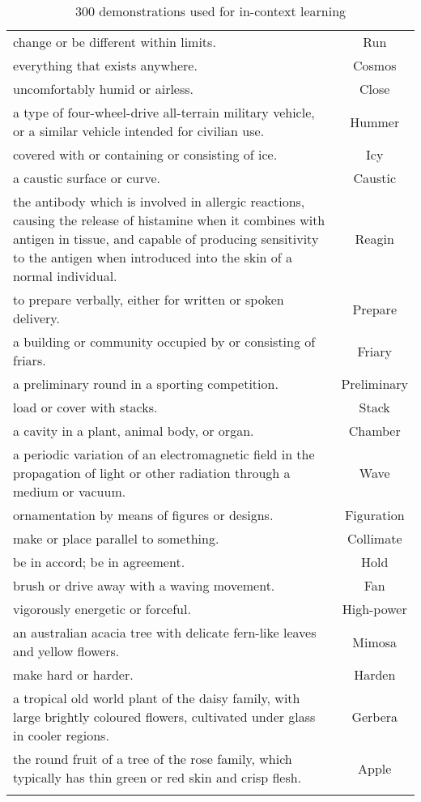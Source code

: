 \begin{longtable}{p{12cm}c}
change or be different within limits. & Run\\
everything that exists anywhere. & Cosmos\\
uncomfortably humid or airless. & Close\\
a type of four-wheel-drive all-terrain military vehicle, or a similar vehicle intended for civilian use. & Hummer\\
covered with or containing or consisting of ice. & Icy\\
a caustic surface or curve. & Caustic\\
the antibody which is involved in allergic reactions, causing the release of histamine when it combines with antigen in tissue, and capable of producing sensitivity to the antigen when introduced into the skin of a normal individual. & Reagin\\
to prepare verbally, either for written or spoken delivery. & Prepare\\
a building or community occupied by or consisting of friars. & Friary\\
a preliminary round in a sporting competition. & Preliminary\\
load or cover with stacks. & Stack\\
a cavity in a plant, animal body, or organ. & Chamber\\
a periodic variation of an electromagnetic field in the propagation of light or other radiation through a medium or vacuum. & Wave\\
ornamentation by means of figures or designs. & Figuration\\
make or place parallel to something. & Collimate\\
be in accord; be in agreement. & Hold\\
brush or drive away with a waving movement. & Fan\\
vigorously energetic or forceful. & High-power\\
an australian acacia tree with delicate fern-like leaves and yellow flowers. & Mimosa\\
make hard or harder. & Harden\\
a tropical old world plant of the daisy family, with large brightly coloured flowers, cultivated under glass in cooler regions. & Gerbera\\
the round fruit of a tree of the rose family, which typically has thin green or red skin and crisp flesh. & Apple\\
\caption{300 demonstrations used for in-context learning}
\end{longtable}

%

